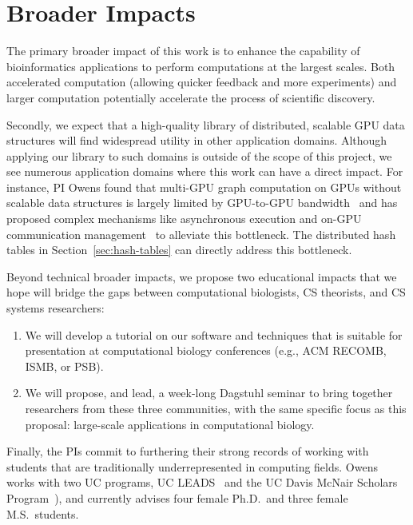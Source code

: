 \section{Broader Impacts}
\label{broadimpacts}

The primary broader impact of this work is to enhance the capability of bioinformatics applications to perform computations at the largest scales. Both accelerated computation (allowing quicker feedback and more experiments) and larger computation potentially accelerate the process of scientific discovery. 

Secondly, we expect that a high-quality library of distributed, scalable GPU data structures will find widespread utility in other application domains. Although applying our library to such domains is outside of the scope of this project, we see numerous application domains where this work can have a direct impact. For instance, PI Owens found that multi-GPU graph computation on GPUs without scalable data structures is largely limited by GPU-to-GPU bandwidth~\cite{Pan:2017:MGA} and has proposed complex mechanisms like asynchronous execution and on-GPU communication management~\cite{Chen:2022:SIP} to alleviate this bottleneck. The distributed hash tables in Section~\ref{sec:hash-tables} can directly address this bottleneck.

Beyond technical broader impacts, we propose two educational impacts that we hope will bridge the gaps between computational biologists, CS theorists, and CS systems researchers:

\begin{enumerate}
  \item We will develop a tutorial on our software and techniques that is suitable for presentation at computational biology conferences (e.g., ACM RECOMB, ISMB, or PSB).
  \item We will propose, and lead, a week-long Dagstuhl seminar to bring together researchers from these three communities, with the same specific focus as this proposal: large-scale applications in computational biology.
\end{enumerate}

Finally, the PIs commit to furthering their strong records of working with students that are traditionally underrepresented in computing fields. Owens works with two UC programs, UC LEADS~\cite{UCLeads:2003:WEB} and the UC Davis McNair Scholars Program~\cite{McNair:2003:WEB}), and currently advises four female Ph.D.\ and three female M.S.\ students.


